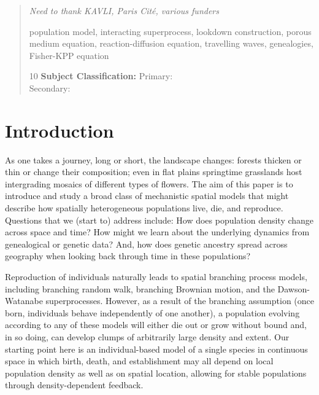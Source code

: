 \documentclass[12pt]{article}
\newcommand{\comment}[1]{{\color{blue} \it #1}}
\numberwithin{equation}{section}
\begin{document}
\begin{abstract}
\vspace{.1in}

	\comment{Need to thank KAVLI, Paris Cit\'e, various funders}

\vspace{.1in}

  population model, interacting superprocess, 
lookdown construction, porous medium equation, 
reaction-diffusion equation, travelling waves, genealogies,
Fisher-KPP equation

\vspace{.1in}



10 {\bf Subject Classification:}  Primary:  
\\Secondary:   %
 
\end{abstract}
\tableofcontents
\newpage


\section{Introduction}
\label{introduction}

As one takes a journey, long or short, the landscape changes:
forests thicken or thin or change their composition;
even in flat plains
springtime grasslands host intergrading mosaics of different types of flowers.
The aim of this paper is to introduce and study
a broad class of mechanistic spatial models
that might describe how spatially heterogeneous populations live, die, and reproduce.
Questions that we (start to) address include:
How does population density change across space and time?
How might we learn about the underlying dynamics from genealogical or genetic data?
And, how does genetic ancestry spread across geography
when looking back through time in these populations?

Reproduction of individuals naturally leads to spatial branching process models,
including branching random walk, 
branching Brownian motion, and the Dawson-Watanabe superprocesses.  
However, as a result of the branching assumption (once born, individuals behave 
independently of one another), 
a population evolving according to any of these models will
either die out or grow without bound and, in so doing, can
develop clumps of arbitrarily large density and extent. 
Our starting point here is an individual-based model of a single species 
in continuous space in which
birth, death, and establishment may all depend on local population density
as well as on spatial location,
allowing for stable populations through density-dependent feedback.
\end{document}

